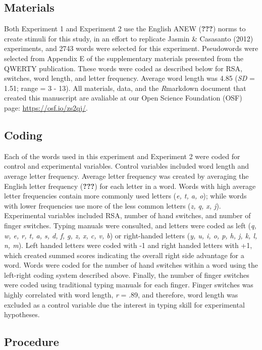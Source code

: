 \documentclass[english,man]{apa6}
\theoremstyle{definition}
\theoremstyle{definition}
\theoremstyle{definition}
\theoremstyle{remark}
\begin{document}
\subsection{Materials}\label{materials}

Both Experiment 1 and Experiment 2 use the English ANEW ({\textbf{???}})
norms to create stimuli for this study, in an effort to replicate Jasmin
\& Casasanto (2012) experiments, and 2743 words were selected for this
experiment. Pseudowords were selected from Appendix E of the
supplementary materials presented from the QWERTY publication. These
words were coded as described below for RSA, switches, word length, and
letter frequency. Average word length was 4.85 (\emph{SD} = 1.51; range
= 3 - 13). All materials, data, and the \emph{R}markdown document that
created this manuscript are avaliable at our Open Science Foundation
(OSF) page: \url{https://osf.io/zs2qj/}.

\subsection{Coding}\label{coding}

Each of the words used in this experiment and Experiment 2 were coded
for control and experimental variables. Control variables included word
length and average letter frequency. Average letter frequency was
created by averaging the English letter frequency ({\textbf{???}}) for
each letter in a word. Words with high average letter frequencies
contain more commonly used letters (\emph{e, t, a, o}); while words with
lower frequencies use more of the less common letters (\emph{z, q, x,
j}). Experimental variables included RSA, number of hand switches, and
number of finger switches. Typing manuals were consulted, and letters
were coded as left (\emph{q, w, e, r, t, a, s, d, f, g, z, x, c, v, b})
or right-handed letters (\emph{y, u, i, o, p, h, j, k, l, n, m}). Left
handed letters were coded with -1 and right handed letters with +1,
which created summed scores indicating the overall right side advantage
for a word. Words were coded for the number of hand switches within a
word using the left-right coding system described above. Finally, the
number of finger switches were coded using traditional typing manuals
for each finger. Finger switches was highly correlated with word length,
\emph{r} = .89, and therefore, word length was excluded as a control
variable due the interest in typing skill for experimental hypotheses.

\subsection{Procedure}\label{procedure}
\end{document}
